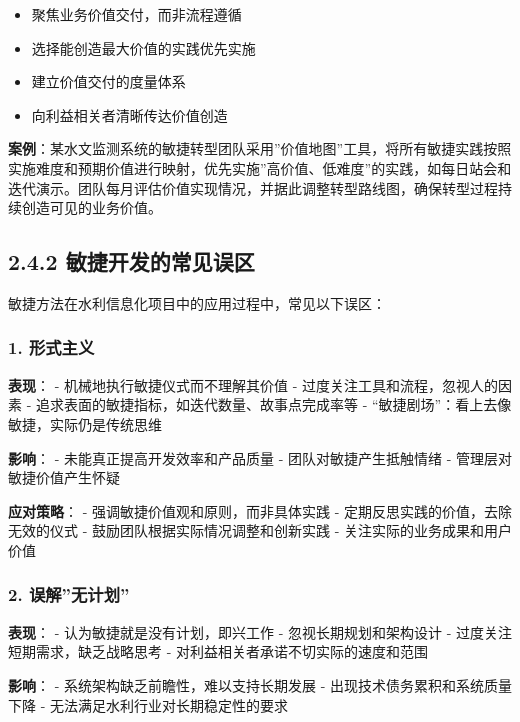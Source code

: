 \begin{itemize}
\tightlist
\item
  聚焦业务价值交付，而非流程遵循
\item
  选择能创造最大价值的实践优先实施
\item
  建立价值交付的度量体系
\item
  向利益相关者清晰传达价值创造
\end{itemize}

\textbf{案例}：某水文监测系统的敏捷转型团队采用''价值地图''工具，将所有敏捷实践按照实施难度和预期价值进行映射，优先实施''高价值、低难度''的实践，如每日站会和迭代演示。团队每月评估价值实现情况，并据此调整转型路线图，确保转型过程持续创造可见的业务价值。

\subsection{2.4.2
敏捷开发的常见误区}\label{ux654fux6377ux5f00ux53d1ux7684ux5e38ux89c1ux8befux533a}

敏捷方法在水利信息化项目中的应用过程中，常见以下误区：

\subsubsection{1. 形式主义}\label{ux5f62ux5f0fux4e3bux4e49}

\textbf{表现}： - 机械地执行敏捷仪式而不理解其价值 -
过度关注工具和流程，忽视人的因素 -
追求表面的敏捷指标，如迭代数量、故事点完成率等 -
``敏捷剧场''：看上去像敏捷，实际仍是传统思维

\textbf{影响}： - 未能真正提高开发效率和产品质量 -
团队对敏捷产生抵触情绪 - 管理层对敏捷价值产生怀疑

\textbf{应对策略}： - 强调敏捷价值观和原则，而非具体实践 -
定期反思实践的价值，去除无效的仪式 - 鼓励团队根据实际情况调整和创新实践
- 关注实际的业务成果和用户价值

\subsubsection{2. 误解''无计划''}\label{ux8befux89e3ux65e0ux8ba1ux5212}

\textbf{表现}： - 认为敏捷就是没有计划，即兴工作 -
忽视长期规划和架构设计 - 过度关注短期需求，缺乏战略思考 -
对利益相关者承诺不切实际的速度和范围

\textbf{影响}： - 系统架构缺乏前瞻性，难以支持长期发展 -
出现技术债务累积和系统质量下降 - 无法满足水利行业对长期稳定性的要求

